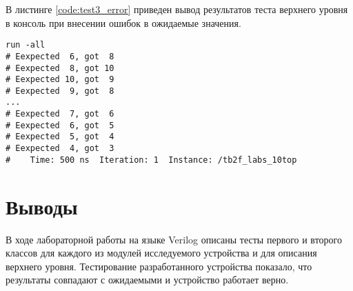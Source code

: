 В листинге \ref{code:test3_error} приведен вывод результатов теста верхнего уровня в консоль при внесении ошибок в ожидаемые значения.
\begin{lstlisting}[caption=Результаты ошибочного теста второго класса с чтением файлов, label=code:test3_error, style=console]
run -all
# Eexpected  6, got  8
# Eexpected  8, got 10
# Eexpected 10, got  9
# Eexpected  9, got  8
...
# Eexpected  7, got  6
# Eexpected  6, got  5
# Eexpected  5, got  4
# Eexpected  4, got  3
#    Time: 500 ns  Iteration: 1  Instance: /tb2f_labs_10top
\end{lstlisting}

\section{Выводы}

В ходе лабораторной работы на языке Verilog описаны тесты первого и второго классов для каждого из модулей исследуемого устройства и для описания верхнего уровня. Тестирование разработанного устройства показало, что результаты совпадают с ожидаемыми и устройство работает верно.

